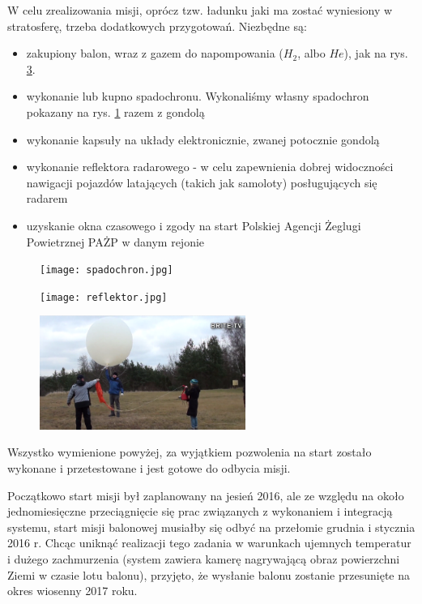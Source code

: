 \documentclass[a4paper,12pt]{article}
\begin{document}
W celu zrealizowania misji, oprócz tzw. ładunku jaki ma zostać wyniesiony w stratosferę, trzeba dodatkowych przygotowań. Niezbędne są: 
\begin{itemize}
 \item zakupiony balon, wraz z gazem do napompowania ($H_2$, albo $He$), jak na rys. \ref{balon}.
 \item wykonanie lub kupno spadochronu. Wykonaliśmy własny spadochron pokazany na rys. \ref{spadochron} razem z gondolą
 \item wykonanie kapsuły na układy elektronicznie, zwanej potocznie gondolą
 \item wykonanie reflektora radarowego - w celu zapewnienia dobrej widoczności nawigacji pojazdów latających (takich jak samoloty) posługujących się radarem
 \item uzyskanie okna czasowego i zgody na start Polskiej Agencji Żeglugi Powietrznej PAŻP w danym rejonie 
\end{itemize}

\begin{figure}[H]
\texttt{[image: spadochron.jpg]}
\centering{}
\label{spadochron}
\end{figure}

\begin{figure}[H]
\texttt{[image: reflektor.jpg]}
\centering{}
\label{reflektor}
\end{figure}

\begin{figure}[H]
\centering
\includegraphics[width=0.6\textwidth]{balon.png}
\label{balon}
\end{figure}

Wszystko wymienione powyżej, za wyjątkiem pozwolenia na start zostało wykonane i przetestowane i jest gotowe do odbycia misji.

Początkowo start misji był zaplanowany na jesień 2016, ale ze względu na około jednomiesięczne przeciągnięcie się prac związanych z wykonaniem i integracją systemu, start misji balonowej musiałby się odbyć na przełomie grudnia i stycznia 2016 r. Chcąc uniknąć realizacji tego zadania w warunkach ujemnych temperatur i dużego zachmurzenia (system zawiera kamerę nagrywającą obraz powierzchni Ziemi w czasie lotu balonu), przyjęto, że wysłanie balonu zostanie przesunięte na okres wiosenny 2017 roku.
\end{document}

